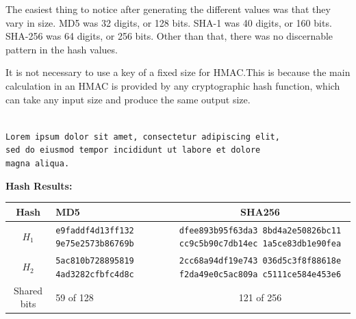 \documentclass[12pt,largemargins]{homework}
\newcommand{\code}{\texttt}
\begin{document}
\maketitle

The easiest thing to notice after generating the different values was that
they vary in size. MD5 was 32 digits, or 128 bits. SHA-1 was 40 digits, or
160 bits. SHA-256 was 64 digits, or 256 bits. Other than that, there was no
discernable pattern in the hash values.

It is not necessary to use a key of a fixed size for HMAC.\@ This is because the
main calculation in an HMAC is provided by any cryptographic hash function,
which can take any input size and produce the same output size.

\begin{alphaparts}
    \\\code{Lorem ipsum dolor sit amet, consectetur adipiscing elit,
    \\sed do eiusmod tempor incididunt ut labore et dolore
    \\magna aliqua.}

    \textbf{Hash Results:}
    \begin{center}
    \begin{tabular}{|c|M|S|}\hline
        \textbf{Hash} & \textbf{MD5} & \textbf{SHA256} \\\hline
        $H_1$ & \code{e9faddf4d13ff132 9e75e2573b86769b} & \code{dfee893b95f63da3
        8bd4a2e50826bc11 cc9c5b90c7db14ec 1a5ce83db1e90fea}\\\hline
        $H_2$ & \code{5ac810b728895819 4ad3282cfbfc4d8c} & \code{2cc68a94df19e743
        036d5c3f8f88618e f2da49e0c5ac809a c5111ce584e453e6}\\\hline
        Shared bits & 59 of 128 & 121 of 256 \\\hline
    \end{tabular}
    \end{center}
\end{alphaparts}
\end{document}
